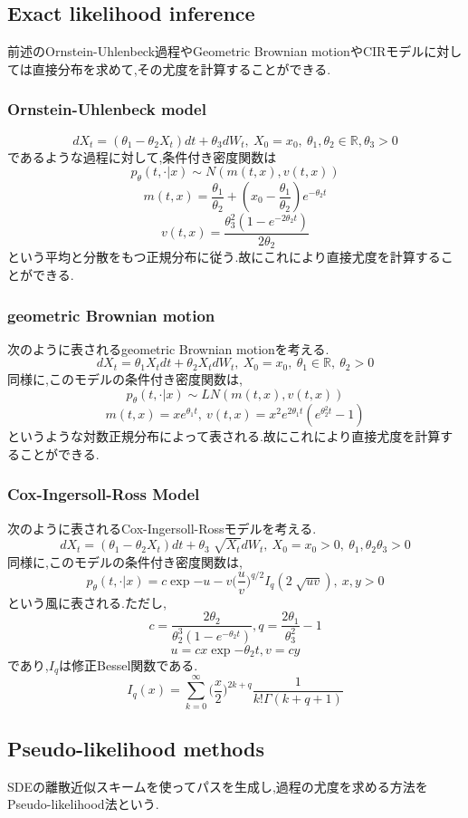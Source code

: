 \documentclass[a4paper,dvipdfmx]{jreport}
\numberwithin{equation}{section}
\def\R{\mathbb R}
\begin{document}
\subsection{Exact likelihood inference}
前述のOrnstein-Uhlenbeck過程やGeometric Brownian motionやCIRモデルに対しては直接分布を求めて,その尤度を計算することができる.
\subsubsection{Ornstein-Uhlenbeck model}
\[
dX_t = (\theta_1 - \theta_2 X_t )  dt + \theta_3 dW_t ,\  X_0=x_0, \ \theta_1,\theta_2\in \R,\theta_3>0
\]
であるような過程に対して,条件付き密度関数は
\[
p_\theta(t,\cdot | x) \sim N(m(t,x),v(t,x))
\]
\[
m(t,x) = \frac{\theta_1}{\theta_2} + (x_0 -\frac{\theta_1}{\theta_2} ) e^{-\theta_2 t}
\]
\[
v(t,x) = \frac{\theta_3^2(1-e^{-2\theta_2 t})}{2\theta_2} 
\]
という平均と分散をもつ正規分布に従う.故にこれにより直接尤度を計算することができる.

\subsubsection{geometric Brownian motion}
次のように表されるgeometric Brownian motionを考える.
\[
dX_t = \theta_1 X_t dt + \theta_2 X_t dW_t , \ X_0 = x_0 ,\ \theta_1 \in \R,\ \theta_2 >0
\]
同様に,このモデルの条件付き密度関数は,
\[
p_\theta (t,\cdot | x)  \sim LN(m(t,x),v(t,x))
\]
\[
m(t,x)=xe^{\theta_1 t},\ v(t,x)=x^2 e^{2\theta_1 t} (e^{\theta_2^2 t} -1)
\]
というような対数正規分布によって表される.故にこれにより直接尤度を計算することができる.

\subsubsection{Cox-Ingersoll-Ross Model}
次のように表されるCox-Ingersoll-Rossモデルを考える.
\[
dX_t = (\theta_1 - \theta_2 X_t )  dt + \theta_3 \sqrt[]{X_t} dW_t ,\  X_0=x_0>0, \ \theta_1,\theta_2 \theta_3>0
\]
同様に,このモデルの条件付き密度関数は,
\[
p_\theta (t,\cdot | x) = c\exp{-u-v} \biggl(\frac{u}{v}\biggl)^{q/2} I_q(2\sqrt[]{uv}),\ x,y>0
\]
という風に表される.ただし,
\[
c = \frac{2\theta_2}{\theta_2^3(1-e^{-\theta_2 t})} , q= \frac{2\theta_1}{\theta_3^2} -1
\]
\[
u = cx\exp{-\theta_2 t} , v = cy
\]
であり,$I_q$は修正Bessel関数である.
\[
I_q(x)= \sum_{k=0}^\infty \biggl( \frac{x}{2}\biggl)^{2k+q} \frac{1}{k! \Gamma(k+q+1)}
\]
\subsection{Pseudo-likelihood methods}
SDEの離散近似スキームを使ってパスを生成し,過程の尤度を求める方法をPseudo-likelihood法という.
\end{document}
